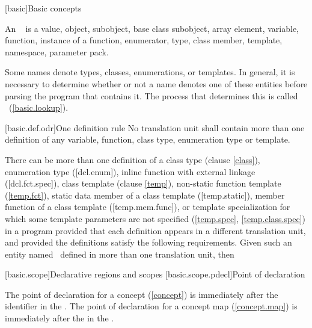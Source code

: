 \documentclass[american]{book}
\begin{document}
[basic]{Basic concepts}
\begin{paras}


\setcounter{Paras}{2}
\textcolor{black}{\pnum}
%
%
%
%
%
%
%
%
An
\ 
%
is a value, object, subobject, base class subobject,
array element, variable,
function, instance of a function,
enumerator, type, class member, template,
namespace, parameter pack. 

\setcounter{Paras}{5}
\pnum
Some names denote types, classes, 
enumerations, or templates. 
In general, it is necessary to determine whether or not
a name denotes one of these entities before parsing the program
that contains it.
The process that determines this is called
\ 
(\ref{basic.lookup}).
%

\setcounter{section}{1}
[basic.def.odr]{One definition rule}
\pnum
No translation unit shall contain more than one definition of any
variable, function, class type, 
enumeration type or template. 

\setcounter{Paras}{4}
\pnum
There can be more than one definition of a class type (clause \ref{class}),
enumeration type ([dcl.enum]),
inline function with external linkage ([dcl.fct.spec]),
class template (clause \ref{temp}), non-static function template (\ref{temp.fct}),
static data member of a class template ([temp.static]),
member function
of a class template
([temp.mem.func]), or
template specialization for which some template parameters are not specified
(\ref{temp.spec}, \ref{temp.class.spec}) in a program
provided that each definition appears in a different translation unit,
and provided the definitions satisfy the following requirements.
Given such an entity named
\tcode{D}\ 
defined in more than one translation unit, then


[basic.scope]{Declarative regions and scopes}
[basic.scope.pdecl]{Point of declaration}
\setcounter{Paras}{9}

\color{addclr}
\pnum
The point of declaration for a concept (\ref{concept}) is
immediately after the identifier in the . The point
of declaration for a concept map (\ref{concept.map}) is
immediately after the \techterm{concept-id} in the
\techterm{concept-map-definition}.
\color{black}


\end{paras}
\end{document}
